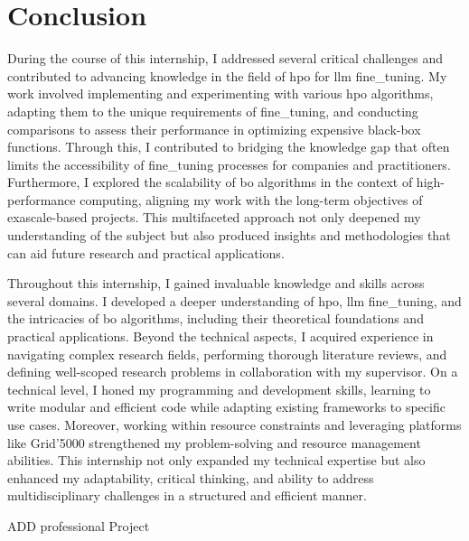 \chapter*{Conclusion}
\label{chap:conclusion}



During the course of this internship, I addressed several critical challenges and contributed to advancing knowledge in the field of \acrlong{hpo} for \acrlong{llm} \gls{fine_tuning}. My work involved implementing and experimenting with various \acrlong{hpo} algorithms, adapting them to the unique requirements of \gls{fine_tuning}, and conducting comparisons to assess their performance in optimizing expensive black-box functions. Through this, I contributed to bridging the knowledge gap that often limits the accessibility of \gls{fine_tuning} processes for companies and practitioners. Furthermore, I explored the scalability of \acrlong{bo} algorithms in the context of high-performance computing, aligning my work with the long-term objectives of exascale-based projects. This multifaceted approach not only deepened my understanding of the subject but also produced insights and methodologies that can aid future research and practical applications.


Throughout this internship, I gained invaluable knowledge and skills across several domains. I developed a deeper understanding of \acrlong{hpo}, \acrlong{llm} \gls{fine_tuning}, and the intricacies of \acrlong{bo} algorithms, including their theoretical foundations and practical applications. Beyond the technical aspects, I acquired experience in navigating complex research fields, performing thorough literature reviews, and defining well-scoped research problems in collaboration with my supervisor. On a technical level, I honed my programming and development skills, learning to write modular and efficient code while adapting existing frameworks to specific use cases. Moreover, working within resource constraints and leveraging platforms like Grid’5000 strengthened my problem-solving and resource management abilities. This internship not only expanded my technical expertise but also enhanced my adaptability, critical thinking, and ability to address multidisciplinary challenges in a structured and efficient manner.

ADD professional Project


